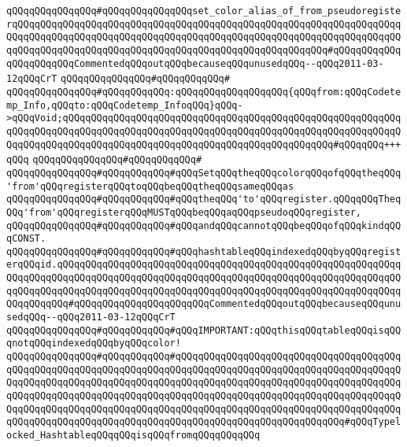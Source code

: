\newline
\verb|qQQqqQQqqQQqqQQq#qQQqqQQqqQQqqQQqset_color_alias_of_from_pseudoregisterqQQqqQQqqQQqqQQqqQQqqQQqqQQqqQQqqQQqqQQqqQQqqQQqqQQqqQQqqQQqqQQqqQQqqQQqqQQqqQQqqQQqqQQqqQQqqQQqqQQqqQQqqQQqqQQqqQQqqQQqqQQqqQQqqQQqqQQqqQQqqQQqqQQqqQQqqQQqqQQqqQQqqQQqqQQqqQQqqQQqqQQqqQQqqQQqqQQq#qQQqqQQqqQQqqQQqqQQqqQQqCommentedqQQqoutqQQqbecauseqQQqunusedqQQq--qQQq2011-03-12qQQqCrT|\newline
\verb|qQQqqQQqqQQqqQQq#qQQqqQQqqQQq#|\newline
\verb|qQQqqQQqqQQqqQQq#qQQqqQQqqQQq:qQQqqQQqqQQqqQQqqQQq{qQQqfrom:qQQqCodetemp_Info,qQQqto:qQQqCodetemp_InfoqQQq}qQQq->qQQqVoid;qQQqqQQqqQQqqQQqqQQqqQQqqQQqqQQqqQQqqQQqqQQqqQQqqQQqqQQqqQQqqQQqqQQqqQQqqQQqqQQqqQQqqQQqqQQqqQQqqQQqqQQqqQQqqQQqqQQqqQQqqQQqqQQqqQQqqQQqqQQqqQQqqQQqqQQqqQQqqQQqqQQqqQQqqQQqqQQqqQQqqQQqqQQq#qQQqqQQq+++qQQq|\newline
\verb|qQQqqQQqqQQqqQQq#qQQqqQQqqQQq#|\newline
\verb|qQQqqQQqqQQqqQQq#qQQqqQQqqQQq#qQQqSetqQQqtheqQQqcolorqQQqofqQQqtheqQQq'from'qQQqregisterqQQqtoqQQqbeqQQqtheqQQqsameqQQqas|\newline
\verb|qQQqqQQqqQQqqQQq#qQQqqQQqqQQq#qQQqtheqQQq'to'qQQqregister.qQQqqQQqTheqQQq'from'qQQqregisterqQQqMUSTqQQqbeqQQqaqQQqpseudoqQQqregister,|\newline
\verb|qQQqqQQqqQQqqQQq#qQQqqQQqqQQq#qQQqandqQQqcannotqQQqbeqQQqofqQQqkindqQQqCONST.|\newline
\newline
\verb|qQQqqQQqqQQqqQQq#qQQqqQQqqQQq#qQQqhashtableqQQqindexedqQQqbyqQQqregisterqQQqid.qQQqqQQqqQQqqQQqqQQqqQQqqQQqqQQqqQQqqQQqqQQqqQQqqQQqqQQqqQQqqQQqqQQqqQQqqQQqqQQqqQQqqQQqqQQqqQQqqQQqqQQqqQQqqQQqqQQqqQQqqQQqqQQqqQQqqQQqqQQqqQQqqQQqqQQqqQQqqQQqqQQqqQQqqQQqqQQqqQQqqQQqqQQqqQQqqQQqqQQqqQQqqQQqqQQq#qQQqqQQqqQQqqQQqqQQqqQQqCommentedqQQqoutqQQqbecauseqQQqunusedqQQq--qQQq2011-03-12qQQqCrT|\newline
\verb|qQQqqQQqqQQqqQQq#qQQqqQQqqQQq#qQQqIMPORTANT:qQQqthisqQQqtableqQQqisqQQqnotqQQqindexedqQQqbyqQQqcolor!|\newline
\verb|qQQqqQQqqQQqqQQq#qQQqqQQqqQQq#qQQqqQQqqQQqqQQqqQQqqQQqqQQqqQQqqQQqqQQqqQQqqQQqqQQqqQQqqQQqqQQqqQQqqQQqqQQqqQQqqQQqqQQqqQQqqQQqqQQqqQQqqQQqqQQqqQQqqQQqqQQqqQQqqQQqqQQqqQQqqQQqqQQqqQQqqQQqqQQqqQQqqQQqqQQqqQQqqQQqqQQqqQQqqQQqqQQqqQQqqQQqqQQqqQQqqQQqqQQqqQQqqQQqqQQqqQQqqQQqqQQqqQQqqQQqqQQqqQQqqQQqqQQqqQQqqQQqqQQqqQQqqQQqqQQqqQQqqQQqqQQqqQQqqQQqqQQqqQQqqQQqqQQqqQQqqQQqqQQqqQQqqQQqqQQqqQQqqQQqqQQqqQQqqQQqqQQqqQQq#qQQqTypelocked_HashtableqQQqqQQqisqQQqfromqQQqqQQqqQQq|\newline
